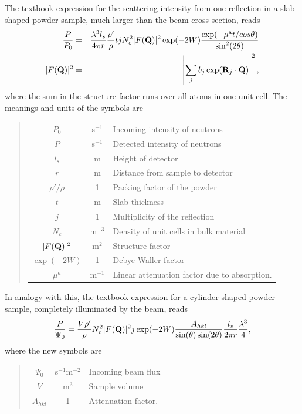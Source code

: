 The textbook expression for the scattering intensity
from one reflection in a slab-shaped powder sample,
much larger than the beam cross section, reads \cite{bacon}
\begin{eqnarray}
\label{e:slab}
\frac{P}{P_0} &=& \frac{\lambda^3 l_s}{4\pi r} \frac{\rho'}{\rho}
         t j N_c^2 |F({\bf Q})|^2 \exp(-2W)
         \frac{\exp(-\mu^{\rm a} t / cos \theta)}{\sin^2(2\theta)} \\ 
|F({\bf Q})|^2 &=& 
 \left| \sum_j b_j \exp({\bf R}_j \cdot {\bf Q}) \right|^2 , 
\end{eqnarray}
where the sum in the structure factor runs over all atoms in one unit cell.
The meanings and units of the symbols are
%
\begin{quote}\begin{tabular}{ccl}
$P_0$ & s$^{-1}$ & Incoming intensity of neutrons \\
$P$   & s$^{-1}$ & Detected intensity of neutrons \\
$l_s$ & m        & Height of detector \\
$r$   & m        & Distance from sample to detector \\
$\rho'/\rho$ & 1 & Packing factor of the powder \\
$t$   & m        & Slab thickness \\
$j$   & 1        & Multiplicity of the reflection \\
$N_c$ & m$^{-3}$ & Density of unit cells in bulk material\\
$|F({\bf Q})|^2$ & m$^2$  & Structure factor \\
$\exp(-2W)$ & 1  & Debye-Waller factor \\
$\mu^a$ & m$^{-1}$ & Linear attenuation factor due to absorption. \\
\end{tabular}\end{quote}
%
In analogy with this, the textbook expression for a cylinder shaped powder
sample, completely illuminated by the beam, reads \cite{bacon}
\begin{equation}
\frac{P}{\Psi_0} = 
 \frac{V \rho'}{\rho} N_c^2 |F({\bf Q})|^2 j \exp(-2W)
                    \frac{A_{hkl}}{\sin(\theta)\sin(2\theta)}
                    \frac{l_s}{2\pi r} \frac{\lambda^3}{4} ,
\end{equation}
where the new symbols are
%
\begin{quote}\begin{tabular}{ccl}
$\Psi_0$  & s$^{-1}$m$^{-2}$ & Incoming beam flux \\
$V$       & m$^3$    & Sample volume \\
$A_{hkl}$ & 1        & Attenuation factor. \\
\end{tabular}\end{quote}

